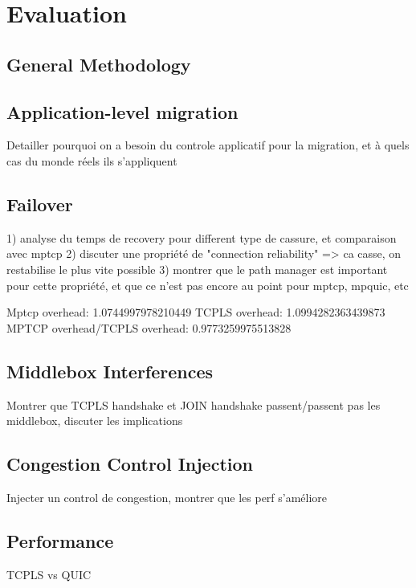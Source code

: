 \section{Evaluation}

\subsection{General Methodology}

\subsection{Application-level migration}

Detailler pourquoi on a besoin du controle applicatif pour la migration, et à
quels cas du monde réels ils s'appliquent

\subsection{Failover}

1) analyse du temps de recovery pour different type de cassure, et comparaison avec mptcp
2) discuter une propriété de "connection reliability" => ca casse, on restabilise le plus vite possible
3) montrer que le path manager est important pour cette propriété, et que ce n'est pas encore au point pour mptcp, mpquic, etc

Mptcp overhead: 1.0744997978210449
TCPLS overhead: 1.0994282363439873
MPTCP overhead/TCPLS overhead:              0.9773259975513828


\subsection{Middlebox Interferences}

Montrer que TCPLS handshake et JOIN handshake passent/passent pas les middlebox,
discuter les implications

\subsection{Congestion Control Injection}

Injecter un control de congestion, montrer que les perf s'améliore

\subsection{Performance}

TCPLS vs QUIC
